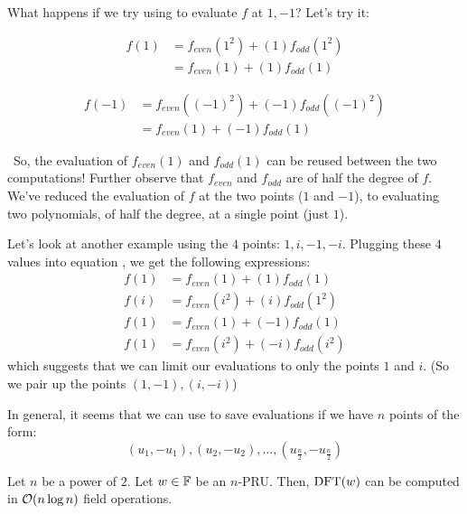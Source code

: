 What happens if we try using  to evaluate $f$ at $1, -1$?
Let's try it:

\begin{minipage}{0.4\textwidth}
    \centering
    \begin{align*}
        f(1) &= f_{even}(1^2) + (1)f_{odd}(1^2) \\
        &= f_{even}(1) + (1)f_{odd}(1)
    \end{align*}
\end{minipage}
\begin{minipage}{0.6\textwidth}
    \centering
    \begin{align*}
        f(-1) &= f_{even}((-1)^2) + (-1)f_{odd}((-1)^2) \\
        &= f_{even}(1) + (-1)f_{odd}(1)
    \end{align*}
\end{minipage}

~\newline So, the evaluation of $f_{even}(1)$ and $f_{odd}(1)$ can be reused between the two computations!
Further observe that $f_{even}$ and $f_{odd}$ are of half the degree of $f$.
We've reduced the evaluation of $f$ at the two points ($1$ and $-1$), to evaluating two polynomials, of half the degree, at a single point (just $1$).

Let's look at another example using the $4$ points: $1, i, - 1, - i$.
Plugging these $4$ values into equation , we get the following expressions:
\begin{align*}
    f(1) &= f_{even}(1) + (1)f_{odd}(1) \\
    f(i) &= f_{even}(i^2) + (i)f_{odd}(1^2) \\
    f(1) &= f_{even}(1) + (-1)f_{odd}(1) \\
    f(1) &= f_{even}(i^2) + (-i)f_{odd}(i^2)
\end{align*}
which suggests that we can limit our evaluations to only the points $1$ and $i$. (So we pair up the points $(1, -1), (i, -i)$)

In general, it seems that we can use  to save evaluations if we have $n$ points of the form:
\begin{equation*}
    (u_1, -u_1), (u_2, -u_2), \ldots, (u_{\frac{n}{2}}, -u_{\frac{n}{2}})
\end{equation*}

\begin{theorem}{}{}
    Let $n$ be a power of $2$. Let $w \in \operatorname{\mathbb{F}}$ be an $n$-PRU. Then, $\operatorname{DFT}(w)$ can be computed in $\operatorname{\mathcal{O}}(n\log n)$ field operations.
\end{theorem}

